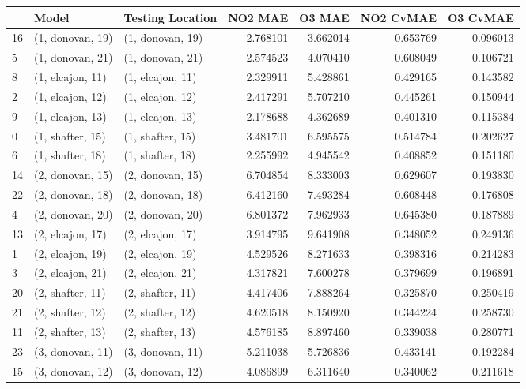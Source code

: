 \begin{tabular}{lllrrrr}
\toprule
{} &             Model &  Testing Location &   NO2 MAE &    O3 MAE &  NO2 CvMAE &  O3 CvMAE \\
\midrule
16 &  (1, donovan, 19) &  (1, donovan, 19) &  2.768101 &  3.662014 &   0.653769 &  0.096013 \\
5  &  (1, donovan, 21) &  (1, donovan, 21) &  2.574523 &  4.070410 &   0.608049 &  0.106721 \\
8  &  (1, elcajon, 11) &  (1, elcajon, 11) &  2.329911 &  5.428861 &   0.429165 &  0.143582 \\
2  &  (1, elcajon, 12) &  (1, elcajon, 12) &  2.417291 &  5.707210 &   0.445261 &  0.150944 \\
9  &  (1, elcajon, 13) &  (1, elcajon, 13) &  2.178688 &  4.362689 &   0.401310 &  0.115384 \\
0  &  (1, shafter, 15) &  (1, shafter, 15) &  3.481701 &  6.595575 &   0.514784 &  0.202627 \\
6  &  (1, shafter, 18) &  (1, shafter, 18) &  2.255992 &  4.945542 &   0.408852 &  0.151180 \\
14 &  (2, donovan, 15) &  (2, donovan, 15) &  6.704854 &  8.333003 &   0.629607 &  0.193830 \\
22 &  (2, donovan, 18) &  (2, donovan, 18) &  6.412160 &  7.493284 &   0.608448 &  0.176808 \\
4  &  (2, donovan, 20) &  (2, donovan, 20) &  6.801372 &  7.962933 &   0.645380 &  0.187889 \\
13 &  (2, elcajon, 17) &  (2, elcajon, 17) &  3.914795 &  9.641908 &   0.348052 &  0.249136 \\
1  &  (2, elcajon, 19) &  (2, elcajon, 19) &  4.529526 &  8.271633 &   0.398316 &  0.214283 \\
3  &  (2, elcajon, 21) &  (2, elcajon, 21) &  4.317821 &  7.600278 &   0.379699 &  0.196891 \\
20 &  (2, shafter, 11) &  (2, shafter, 11) &  4.417406 &  7.888264 &   0.325870 &  0.250419 \\
21 &  (2, shafter, 12) &  (2, shafter, 12) &  4.620518 &  8.150920 &   0.344224 &  0.258730 \\
11 &  (2, shafter, 13) &  (2, shafter, 13) &  4.576185 &  8.897460 &   0.339038 &  0.280771 \\
23 &  (3, donovan, 11) &  (3, donovan, 11) &  5.211038 &  5.726836 &   0.433141 &  0.192284 \\
15 &  (3, donovan, 12) &  (3, donovan, 12) &  4.086899 &  6.311640 &   0.340062 &  0.211618 \\

\end{tabular}
